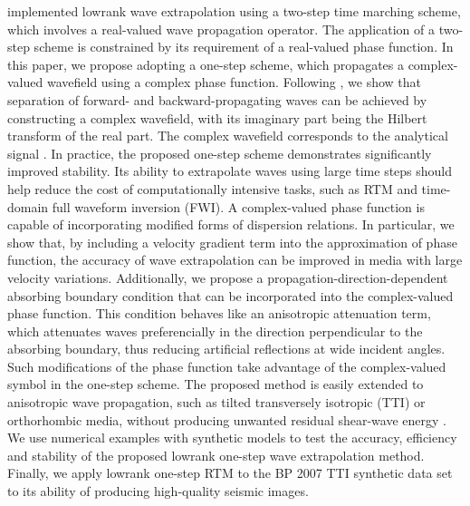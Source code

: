 \cite{lowrank} implemented lowrank wave extrapolation using a two-step time marching scheme, which involves a real-valued wave propagation operator. The application of a two-step scheme is constrained by its requirement of a real-valued phase function. In this paper, we propose adopting a one-step scheme, which propagates a complex-valued wavefield using a complex phase function. Following \cite{zhang09}, we show that separation of forward- and backward-propagating waves can be achieved by constructing a complex wavefield, with its imaginary part being the Hilbert transform of the real part. The complex wavefield corresponds to the analytical signal \cite[]{taner79}. In practice, the proposed one-step scheme demonstrates significantly improved stability. Its ability to extrapolate waves using large time steps should help reduce the cost of computationally intensive tasks, such as RTM and time-domain full waveform inversion (FWI). A complex-valued phase function is capable of incorporating modified forms of dispersion relations. 
In particular, we show that, by including a velocity gradient term into the approximation of phase function, the accuracy of wave extrapolation can be improved in media with large velocity variations. Additionally, we propose a propagation-direction-dependent absorbing boundary condition that can be incorporated into the complex-valued phase function. This condition behaves like an anisotropic attenuation term, which attenuates waves preferencially in the direction perpendicular to the absorbing boundary, thus reducing artificial reflections at wide incident angles. Such modifications of the phase function take advantage of the complex-valued symbol in the one-step scheme. The proposed method is easily extended to anisotropic wave propagation, such as tilted transversely isotropic (TTI) or orthorhombic media, without producing unwanted residual shear-wave energy \cite[]{rite}. We use numerical examples with synthetic models to test the accuracy, efficiency and stability of the proposed lowrank one-step wave extrapolation method. Finally, we apply lowrank one-step RTM to the BP 2007 TTI synthetic data set to  its ability of producing high-quality seismic images.

